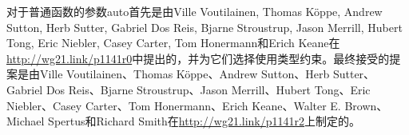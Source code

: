 

对于普通函数的参数auto首先是由Ville Voutilainen, Thomas Köppe, Andrew Sutton, Herb Sutter, Gabriel Dos Reis, Bjarne Stroustrup, Jason Merrill, Hubert Tong, Eric Niebler, Casey Carter, Tom Honermann和Erich Keane在\url{http://wg21.link/p1141r0}中提出的，并为它们选择使用类型约束。最终接受的提案是由Ville Voutilainen、Thomas Köppe、Andrew Sutton、Herb Sutter、Gabriel Dos Reis、Bjarne Stroustrup、Jason Merrill、Hubert Tong、Eric Niebler、Casey Carter、Tom Honermann、Erich Keane、Walter E. Brown、Michael Spertus和Richard Smith在\url{http://wg21.link/p1141r2}上制定的。